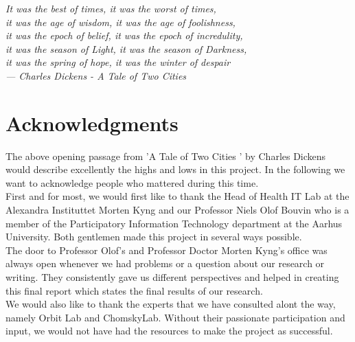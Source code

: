 
\begin{flushright}{\slshape    
	It was the best of times, it was the worst of times,\\
	it was the age of wisdom, it was the age of foolishness,\\ 
	it was the epoch of belief, it was the epoch of incredulity,\\ 
	it was the season of Light, it was the season of Darkness,\\
	it was the spring of hope, it was the winter of despair\\ \medskip
    --- Charles Dickens - A Tale of Two Cities \cite{dickens}}
\end{flushright}



\bigskip

\begingroup
\let\clearpage\relax
\let\cleardoublepage\relax
\let\cleardoublepage\relax
\chapter*{Acknowledgments}

The above opening passage from 'A Tale of Two  Cities ' by Charles Dickens would describe excellently the highs and lows in this project. In the following we want to acknowledge people who mattered during this time.\\


First and for most, we would first like to thank the Head of Health IT Lab at the Alexandra Instituttet Morten Kyng and our Professor Niels Olof Bouvin who is a member of the Participatory Information Technology department at the Aarhus University. Both gentlemen made this project in several ways possible.\\


The door to Professor Olof's and Professor Doctor Morten Kyng's office was always open whenever we had problems or a question about our research or writing. They consistently gave us different perspectives and helped in creating this final report which states the final results of our research.\\


We would also like to thank the experts that we have consulted alont the way, namely Orbit Lab and ChomskyLab. Without their passionate participation and input, we would not have had the resources to make the project as successful.\\
\endgroup



